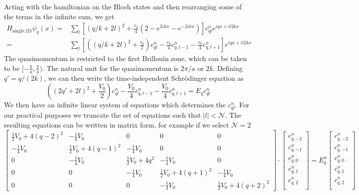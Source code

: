 \documentclass[oneside,11pt]{memoir}
\newcommand{\vo}{\ensuremath{V_{0}}}
\newcommand{\vvo}{\ensuremath{v_{0}}}
\begin{document}
Acting with the hamiltonian on the Bloch states and then rearranging some of
the terms in the infinite sum, we get \begin{equation}
\begin{split}
  H_{\text{single,1D}} \psi_{q}(x) = &  
      \sum_{l} \left[(q/k+2l)^{2} 
      + \frac{\vvo}{4}(2-e^{2ikx}-e^{-2ikx}) \right]
      c_{ql}^{n} e^{iqx+il2kx} \\ 
                                  = &  
      \sum_{l} \left[ \left(  (q/k+2l)^{2} 
      + \frac{\vvo}{2} \right) c_{ql}^{n} 
      - \frac{\vvo}{4}c_{q,l-1}^{n} - \frac{\vvo}{4}c_{q,l+1}^{n} \right] 
      e^{iqx+il2kx} 
\end{split}
\end{equation}
The quasimomentum is restricted to the first Brillouin zone, which can be taken
to be $[-\frac{\pi}{a}, \frac{\pi}{a})$.  The natural unit for the
quasimomentum is $2\pi/a$ or $2k$.  Defining $q'=q/(2k)$,  we can then write
the time-independent Schr\"{o}dinger equation as 
\begin{equation}
  \left(  (2q'+2l)^{2} + \frac{\vo}{2} \right) c_{ql}^{n}
  - \frac{\vo}{4}c_{q,l-1}^{n} - \frac{\vo}{4}c_{q,l+1}^{n} = E_{q} c_{ql}^{n} 
\end{equation}
We then have an infinite linear system of equations which determines the
$c_{ql}^{n}$. For our practical purposes we truncate the set of equations such
that $|l|<\mathcal{N}$.  The resulting equations can be written in matrix form,
for example if we select $\mathcal{N}=2$ 
\begin{equation}
\left[\begin{smallmatrix}\frac{1}{2} V_{{0}} + 4 \left(q -2\right)^{2} & -
\frac{1}{4} V_{{0}} & 0 & 0 & 0\\- \frac{1}{4} V_{{0}} & \frac{1}{2} V_{{0}} +
4 \left(q -1\right)^{2} & - \frac{1}{4} V_{{0}} & 0 & 0\\0 & - \frac{1}{4}
V_{{0}} & \frac{1}{2} V_{{0}} + 4 q^{2} & - \frac{1}{4} V_{{0}} & 0\\0 & 0 & -
\frac{1}{4} V_{{0}} & \frac{1}{2} V_{{0}} + 4 \left(q + 1\right)^{2} & -
\frac{1}{4} V_{{0}}\\0 & 0 & 0 & - \frac{1}{4} V_{{0}} & \frac{1}{2} V_{{0}} +
4 \left(q + 2\right)^{2}\end{smallmatrix}\right] 
%
\cdot
\left[\begin{smallmatrix} 
  c_{q,-2}^{n} \\ 
  c_{q,-1}^{n} \\ 
  c_{q,0}^{n} \\ 
  c_{q,1}^{n} \\ 
  c_{q,2}^{n} \\ 
 \end{smallmatrix}\right]
 = E_{q}^{n} 
\left[\begin{smallmatrix} 
  c_{q,-2}^{n} \\ 
  c_{q,-1}^{n} \\ 
  c_{q,0}^{n} \\ 
  c_{q,1}^{n} \\ 
  c_{q,2}^{n} \\ 
 \end{smallmatrix}\right]
\label{eq:h1dmatrix} 
\end{equation}
\end{document}
